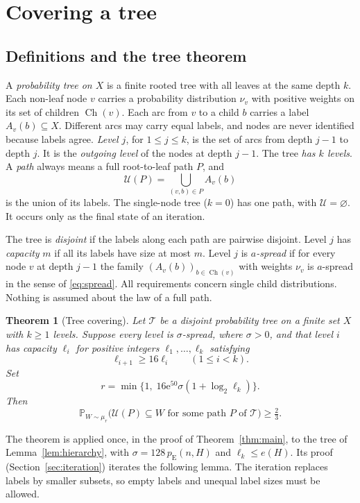 \documentclass[11pt]{article}
\newtheorem{theorem}{Theorem}[section]
\numberwithin{equation}{section}
\newcommand{\PP}{\mathbb P}
\newcommand{\pE}{p_{\mathrm E}}
\newcommand{\TT}{\mathcal T}
\newcommand{\UU}{\mathcal U}
\newcommand{\ch}{\operatorname{Ch}}
\newcommand{\ee}{\mathrm e}
\begin{document}
\section{Covering a tree}\label{sec:trees}

\subsection{Definitions and the tree theorem}

A \emph{probability tree on $X$} is a finite rooted tree with all
leaves at the same depth $k$. Each non-leaf node $v$ carries a
probability distribution $\nu_v$ with positive weights on its set of
children $\ch(v)$. Each arc from $v$ to a child $b$ carries a label
$A_v(b)\subseteq X$. Different arcs may carry equal labels, and nodes
are never identified because labels agree. \emph{Level $j$}, for
$1\le j\le k$, is the set of arcs from depth $j-1$ to depth $j$. It is
the \emph{outgoing level} of the nodes at depth $j-1$. The tree
\emph{has $k$ levels}. A \emph{path} always means a full root-to-leaf
path $P$, and
\[
 \UU(P)=\bigcup_{(v,b)\in P}A_v(b)
\]
is the union of its labels. The single-node tree ($k=0$) has one path,
with $\UU=\varnothing$. It occurs only as the final state of an
iteration.

The tree is \emph{disjoint} if the labels along each path are pairwise
disjoint. Level $j$ has \emph{capacity} $m$ if all its labels have size
at most $m$. Level $j$ is \emph{$a$-spread} if for every node $v$ at
depth $j-1$ the family $(A_v(b))_{b\in\ch(v)}$ with weights $\nu_v$ is
$a$-spread in the sense of \eqref{eq:spread}. All requirements concern
single child distributions. Nothing is assumed about the law of a full
path.

\begin{theorem}[Tree covering]\label{thm:tree}
Let $\TT$ be a disjoint probability tree on a finite set $X$ with
$k\ge1$ levels. Suppose every level is $\sigma$-spread, where
$\sigma>0$, and that level $i$ has capacity $\ell_i$ for positive
integers $\ell_1,\dots,\ell_k$ satisfying
\[
 \ell_{i+1}\ge16\ell_i\qquad(1\le i<k).
\]
Set
\[
 r=\min\{1,\;16\ee^{50}\sigma(1+\log_2\ell_k)\}.
\]
Then
\[
 \PP_{W\sim\mu_r}
 \bigl(\UU(P)\subseteq W\text{ for some path }P\text{ of }\TT\bigr)
 \ge\tfrac23.
\]
\end{theorem}

The theorem is applied once, in the proof of Theorem~\ref{thm:main},
to the tree of Lemma~\ref{lem:hierarchy}, with $\sigma=128\,\pE(n,H)$
and $\ell_k\le e(H)$. Its proof (Section~\ref{sec:iteration}) iterates
the following lemma. The iteration replaces labels by smaller subsets,
so empty labels and unequal label sizes must be allowed.
\end{document}
